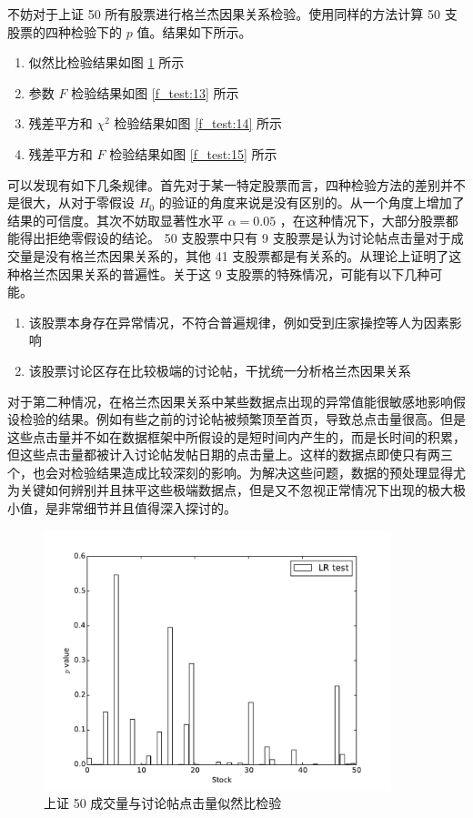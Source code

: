 不妨对于上证 50 所有股票进行格兰杰因果关系检验。使用同样的方法计算 50 支股票的四种检验下的 $p$ 值。结果如下所示。

\begin{enumerate}
  \item 似然比检验结果如图 \ref{f_test:12} 所示
  \item 参数 $F$ 检验结果如图 \ref{f_test:13} 所示
  \item 残差平方和 $\chi^{2}$ 检验结果如图 \ref{f_test:14} 所示
  \item 残差平方和 $F$ 检验结果如图 \ref{f_test:15} 所示
\end{enumerate}

可以发现有如下几条规律。首先对于某一特定股票而言，四种检验方法的差别并不是很大，从对于零假设 $H_{0}$ 的验证的角度来说是没有区别的。从一个角度上增加了结果的可信度。其次不妨取显著性水平 $\alpha=0.05$ ，在这种情况下，大部分股票都能得出拒绝零假设的结论。 50 支股票中只有 9 支股票是认为讨论帖点击量对于成交量是没有格兰杰因果关系的，其他 41 支股票都是有关系的。从理论上证明了这种格兰杰因果关系的普遍性。关于这 9 支股票的特殊情况，可能有以下几种可能。

\begin{enumerate}
  \item 该股票本身存在异常情况，不符合普遍规律，例如受到庄家操控等人为因素影响
  \item 该股票讨论区存在比较极端的讨论帖，干扰统一分析格兰杰因果关系
\end{enumerate}

对于第二种情况，在格兰杰因果关系中某些数据点出现的异常值能很敏感地影响假设检验的结果。例如有些之前的讨论帖被频繁顶至首页，导致总点击量很高。但是这些点击量并不如在数据框架中所假设的是短时间内产生的，而是长时间的积累，但这些点击量都被计入讨论帖发帖日期的点击量上。这样的数据点即使只有两三个，也会对检验结果造成比较深刻的影响。为解决这些问题，数据的预处理显得尤为关键如何辨别并且抹平这些极端数据点，但是又不忽视正常情况下出现的极大极小值，是非常细节并且值得深入探讨的。

\begin{figure}
  \centering
  \includegraphics[width=0.9\textwidth]{plots/click_count_volume_granger_causality_test_on_sse_50_lrtest.pdf}
  \caption{上证 50 成交量与讨论帖点击量似然比检验}
  \label{f_test:12}
\end{figure}

